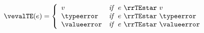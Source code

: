 {\flushleft

\begin{mathpar}


\end{mathpar}

\medskip
{}
\begin{mathpar}


\end{mathpar}

\medskip
$\vevalTE(e) = \left\{ \begin{array}{l l}
  v & \emph{if}~~e~\rrTEstar~v \\
  \typeerror & \emph{if}~~e~\rrTEstar~\typeerror \\
  \valueerror & \emph{if}~~e~\rrTEstar~\valueerror
\end{array}\right.$

}
